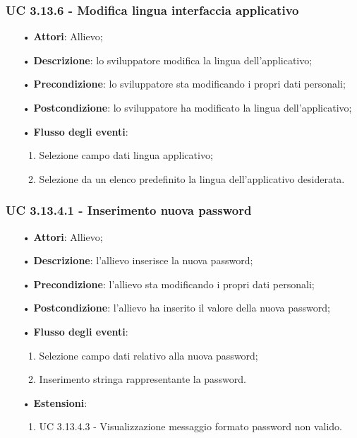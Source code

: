 \subsubsection{UC 3.13.6 - Modifica lingua interfaccia applicativo}
\begin{itemize}
	\item[•]\textbf{Attori}: Allievo;
	\item[•]\textbf{Descrizione}: lo sviluppatore modifica la lingua dell'applicativo;
	\item[•]\textbf{Precondizione}: lo sviluppatore sta modificando i propri dati personali;
	\item[•]\textbf{Postcondizione}: lo sviluppatore ha modificato la lingua dell'applicativo; 
	\item[•]\textbf{Flusso degli eventi}: 
	\begin{enumerate}
		\item Selezione campo dati lingua applicativo;
		\item Selezione da un elenco predefinito la lingua dell'applicativo desiderata.
	\end{enumerate}
\end{itemize}


\subsubsection{UC 3.13.4.1 - Inserimento nuova password}
\begin{itemize}
	\item[•]\textbf{Attori}: Allievo;
	\item[•]\textbf{Descrizione}: l'allievo inserisce la nuova password;
	\item[•]\textbf{Precondizione}: l'allievo sta modificando i propri dati personali;
	\item[•]\textbf{Postcondizione}: l'allievo ha inserito il valore della nuova password; 
	\item[•]\textbf{Flusso degli eventi}: 
	\begin{enumerate}
		\item Selezione campo dati relativo alla nuova password;
		\item Inserimento stringa rappresentante la password.
	\end{enumerate}
	\item[•]\textbf{Estensioni}:
	\begin{enumerate}
		\item UC 3.13.4.3 - Visualizzazione messaggio formato password non valido.
	\end{enumerate}
\end{itemize}

